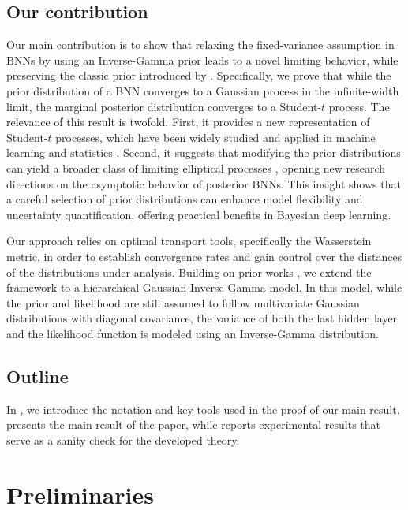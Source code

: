 \subsection{Our contribution}

Our main contribution is to show that relaxing the fixed-variance assumption in BNNs by using an Inverse-Gamma prior leads to a novel limiting behavior, while preserving the classic prior introduced by \citet{neal1996}. 
Specifically, we prove that while the prior distribution of a BNN converges to a Gaussian process in the infinite-width limit, the marginal posterior distribution converges to a Student-$t$ process. 
The relevance of this result is twofold. First, it provides a new representation of Student-$t$ processes, which have been widely studied and applied in machine learning and statistics \citep{shah2014,tracey2018,sellier2023}. 
Second, it suggests that modifying the prior distributions can yield a broader class of limiting elliptical processes \citep{fang1989,bankestad2020}, opening new research directions on the asymptotic behavior of posterior BNNs. 
This insight shows that a careful selection of prior distributions can enhance model flexibility and uncertainty quantification, offering practical benefits in Bayesian deep learning.

Our approach relies on optimal transport tools, specifically the Wasserstein metric, in order to establish convergence rates and gain control over the distances of the distributions under analysis. Building on prior works \citep{basteri2022,trevisan2023}, we extend the framework to a hierarchical Gaussian-Inverse-Gamma model. In this model, while the prior and likelihood are still assumed to follow multivariate Gaussian distributions with diagonal covariance, the variance of both the last hidden layer and the likelihood function is modeled using an Inverse-Gamma distribution.

\subsection{Outline}

In , we introduce the notation and key tools used in the proof of our main result. 
 presents the main result of the paper, while  reports experimental results that serve as a sanity check for the developed theory.

\section{Preliminaries} \label{sec:bnns}

